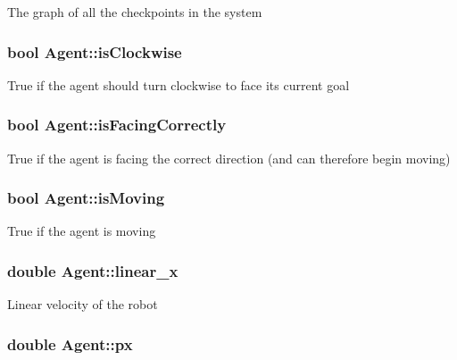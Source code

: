 The graph of all the checkpoints in the system \hypertarget{classAgent_ae4169e63cd18fa7785d4561746f676d1}{
\subsubsection[{is\-Clockwise}]{\setlength{\rightskip}{0pt plus 5cm}bool Agent\-::is\-Clockwise\hspace{0.3cm}{\ttfamily [protected]}}}\label{classAgent_ae4169e63cd18fa7785d4561746f676d1}
True if the agent should turn clockwise to face its current goal \hypertarget{classAgent_afeaa67851b662b45d4d6fcd5eaf5acc3}{
\subsubsection[{is\-Facing\-Correctly}]{\setlength{\rightskip}{0pt plus 5cm}bool Agent\-::is\-Facing\-Correctly\hspace{0.3cm}{\ttfamily [protected]}}}\label{classAgent_afeaa67851b662b45d4d6fcd5eaf5acc3}
True if the agent is facing the correct direction (and can therefore begin moving) \hypertarget{classAgent_aab5675be1775cd18ff37e3e1870d51be}{
\subsubsection[{is\-Moving}]{\setlength{\rightskip}{0pt plus 5cm}bool Agent\-::is\-Moving\hspace{0.3cm}{\ttfamily [protected]}}}\label{classAgent_aab5675be1775cd18ff37e3e1870d51be}
True if the agent is moving \hypertarget{classAgent_a77dfc60513d8c90b2848297e09fffba7}{
\subsubsection[{linear\-\_\-x}]{\setlength{\rightskip}{0pt plus 5cm}double Agent\-::linear\-\_\-x\hspace{0.3cm}{\ttfamily [protected]}}}\label{classAgent_a77dfc60513d8c90b2848297e09fffba7}
Linear velocity of the robot \hypertarget{classAgent_af51536ae3b511b53726b84b9226cc772}{
\subsubsection[{px}]{\setlength{\rightskip}{0pt plus 5cm}double Agent\-::px\hspace{0.3cm}{\ttfamily [protected]}}}\label{classAgent_af51536ae3b511b53726b84b9226cc772}
